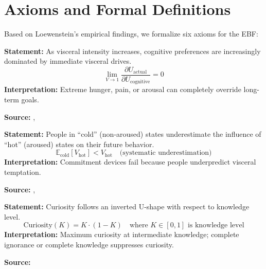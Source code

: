 \section{Axioms and Formal Definitions}
\label{sec:lo-axioms}

Based on Loewenstein's empirical findings, we formalize six axioms for the EBF:

\begin{tcolorbox}[colback=gray!5!white, colframe=gray!75!black,
    title=Axiom LO-1: Visceral Override]
\textbf{Statement:} As visceral intensity increases, cognitive preferences are increasingly dominated by immediate visceral drives.
\begin{equation}
\lim_{V \to 1} \frac{\partial U_{\text{actual}}}{\partial U_{\text{cognitive}}} = 0
\end{equation}
\textbf{Interpretation:} Extreme hunger, pain, or arousal can completely override long-term goals.

\textbf{Source:} \citet{PAP-loewenstein1996out}, \citet{loewenstein2005visceral}
\end{tcolorbox}

\begin{tcolorbox}[colback=gray!5!white, colframe=gray!75!black,
    title=Axiom LO-2: Hot-Cold Empathy Gap]
\textbf{Statement:} People in ``cold'' (non-aroused) states underestimate the influence of ``hot'' (aroused) states on their future behavior.
\begin{equation}
\mathbb{E}_{\text{cold}}[V_{\text{hot}}] < V_{\text{hot}} \quad \text{(systematic underestimation)}
\end{equation}
\textbf{Interpretation:} Commitment devices fail because people underpredict visceral temptation.

\textbf{Source:} \citet{loewenstein2006hot}, \citet{loewenstein2000projecting}
\end{tcolorbox}

\begin{tcolorbox}[colback=gray!5!white, colframe=gray!75!black,
    title=Axiom LO-3: Curiosity as Information Gap]
\textbf{Statement:} Curiosity follows an inverted U-shape with respect to knowledge level.
\begin{equation}
\text{Curiosity}(K) = K \cdot (1-K) \quad \text{where } K \in [0,1] \text{ is knowledge level}
\end{equation}
\textbf{Interpretation:} Maximum curiosity at intermediate knowledge; complete ignorance or complete knowledge suppresses curiosity.

\textbf{Source:} \citet{loewenstein1999curiosity}
\end{tcolorbox}

